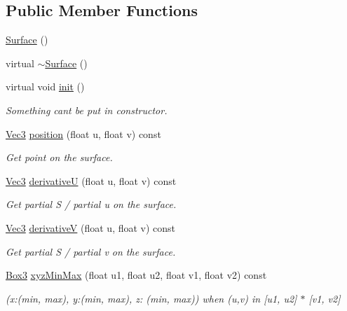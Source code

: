 \subsection*{Public Member Functions}
\begin{DoxyCompactItemize}
\item 
\hyperlink{classSurface_a8fc57f2a15292135c00545c9d224ec68}{Surface} ()
\item 
virtual \hyperlink{classSurface_a44ff6a911acc4ada428c3d734f342a8a}{$\sim$\+Surface} ()
\item 
virtual void \hyperlink{classSurface_a194087202684a4b3a71c24f02faeb404}{init} ()
\begin{DoxyCompactList}\small\item\em Something can\textquotesingle{}t be put in constructor. \end{DoxyCompactList}\item 
\hyperlink{vec_8h_ae4fcaa7c0a3935930ed1be5f70b90373}{Vec3} \hyperlink{classSurface_ac7eb5876716281ea19945829ff9114b3}{position} (float u, float v) const 
\begin{DoxyCompactList}\small\item\em Get point on the surface. \end{DoxyCompactList}\item 
\hyperlink{vec_8h_ae4fcaa7c0a3935930ed1be5f70b90373}{Vec3} \hyperlink{classSurface_a3b60891745ce4a2dc1adc379fc69b866}{derivativeU} (float u, float v) const 
\begin{DoxyCompactList}\small\item\em Get partial S / partial u on the surface. \end{DoxyCompactList}\item 
\hyperlink{vec_8h_ae4fcaa7c0a3935930ed1be5f70b90373}{Vec3} \hyperlink{classSurface_a0c8bd80201b1426d30781d9583e86afd}{derivativeV} (float u, float v) const 
\begin{DoxyCompactList}\small\item\em Get partial S / partial v on the surface. \end{DoxyCompactList}\item 
\hyperlink{structBox3}{Box3} \hyperlink{classSurface_aef6ac6d0bd8f7db26b85f140e4ed2ea8}{xyz\+Min\+Max} (float u1, float u2, float v1, float v2) const 
\begin{DoxyCompactList}\small\item\em (x\+:(min, max), y\+:(min, max), z\+: (min, max)) when (u,v) in \mbox{[}u1, u2\mbox{]} $\ast$ \mbox{[}v1, v2\mbox{]} \end{DoxyCompactList}\item 

\end{DoxyCompactItemize}
